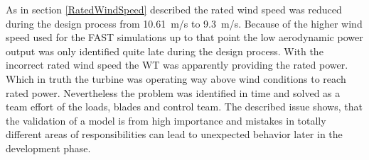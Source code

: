 As in section \ref{RatedWindSpeed} described the rated wind speed was reduced during the design process from \SI{10.61}{m/s} to \SI{9.3}{m/s}.
Because of the higher wind speed used for the \gls{FAST} simulations up to that point the low aerodynamic power output was only identified quite late during the design process.
With the incorrect rated wind speed the \gls{WT} was apparently providing the rated power.
Which in truth the turbine was operating way above wind conditions to reach rated power.
Nevertheless the problem was identified in time and solved as a team effort of the loads, blades and control team. 
The described issue shows, that the validation of a model is from high importance and mistakes in totally different areas of responsibilities can lead to unexpected behavior later in the development phase. 
 